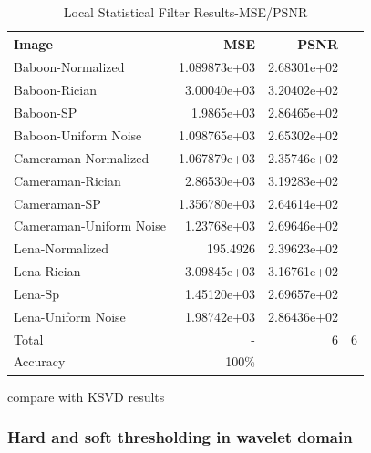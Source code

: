 \begin{table}[H]
\begin{center}
\begin{tabular}{l | r r r}
Image & MSE & PSNR\\
\hline
Baboon-Normalized & 1.089873e+03 &  2.68301e+02\\
Baboon-Rician &  3.00040e+03 & 3.20402e+02\\
Baboon-SP & 1.9865e+03 &  2.86465e+02\\
Baboon-Uniform Noise & 1.098765e+03 & 2.65302e+02\\
Cameraman-Normalized & 1.067879e+03 & 2.35746e+02\\
Cameraman-Rician & 2.86530e+03 & 3.19283e+02\\
Cameraman-SP & 1.356780e+03 &  2.64614e+02\\
Cameraman-Uniform Noise & 1.23768e+03 & 2.69646e+02\\
Lena-Normalized & 195.4926 & 2.39623e+02\\
Lena-Rician & 3.09845e+03 & 3.16761e+02\\
Lena-Sp & 1.45120e+03 &  2.69657e+02\\
Lena-Uniform Noise &  1.98742e+03 & 2.86436e+02\\
\hline
Total & - & 6 & 6 \\
Accuracy & 100\% \\
\end{tabular}
\end{center}
\caption{Local Statistical Filter Results-MSE/PSNR}
\label{LS}
\end{table}

compare with KSVD results

\subsubsection{Hard and soft thresholding in wavelet domain}

